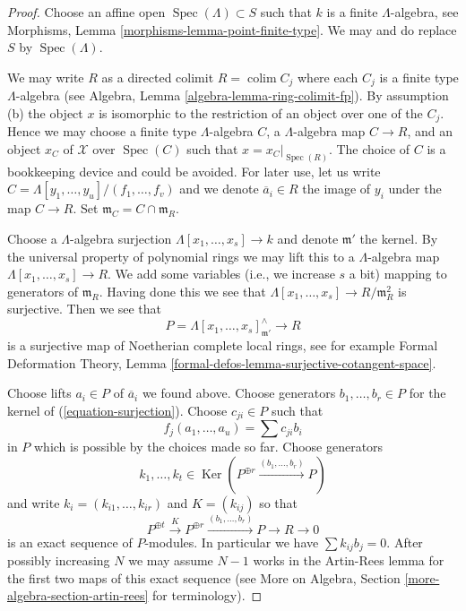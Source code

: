 \documentclass{stacks-project}
\theoremstyle{plain}
\theoremstyle{definition}
\theoremstyle{remark}
\numberwithin{equation}{subsection}
\def\colim{\mathop{\mathrm{colim}}\nolimits}
\def\Spec{\mathop{\mathrm{Spec}}}
\def\Ker{\mathop{\mathrm{Ker}}}
\begin{document}
\begin{proof}
Choose an affine open $\Spec(\Lambda) \subset S$ such that $k$ is a finite
$\Lambda$-algebra, see
Morphisms, Lemma \ref{morphisms-lemma-point-finite-type}.
We may and do replace $S$ by $\Spec(\Lambda)$.

\medskip\noindent
We may write $R$ as a directed colimit $R = \colim C_j$ where each
$C_j$ is a finite type $\Lambda$-algebra (see
Algebra, Lemma \ref{algebra-lemma-ring-colimit-fp}).
By assumption (b) the object $x$ is isomorphic to the restriction of
an object over one of the $C_j$. Hence we may choose a finite type
$\Lambda$-algebra $C$, a $\Lambda$-algebra map $C \to R$, and an object
$x_C$ of $\mathcal{X}$ over $\Spec(C)$ such that $x = x_C|_{\Spec(R)}$.
The choice of $C$ is a bookkeeping device and could be avoided.
For later use, let us write $C = \Lambda[y_1, \ldots, y_u]/(f_1, \ldots, f_v)$
and we denote $\overline{a}_i \in R$ the image of $y_i$ under the
map $C \to R$. Set $\mathfrak m_C = C \cap \mathfrak m_R$.

\medskip\noindent
Choose a $\Lambda$-algebra surjection $\Lambda[x_1, \ldots, x_s] \to k$
and denote $\mathfrak m'$ the kernel.
By the universal property of polynomial rings we may lift this
to a $\Lambda$-algebra map $\Lambda[x_1, \ldots, x_s] \to R$.
We add some variables (i.e., we increase $s$ a bit) mapping to generators
of $\mathfrak m_R$. Having done this we see that
$\Lambda[x_1, \ldots, x_s] \to R/\mathfrak m_R^2$ is surjective.
Then we see that
\begin{equation}
\label{equation-surjection}
P = \Lambda[x_1, \ldots, x_s]_{\mathfrak m'}^\wedge \longrightarrow R
\end{equation}
is a surjective map of Noetherian complete local rings, see for example
Formal Deformation Theory, Lemma
\ref{formal-defos-lemma-surjective-cotangent-space}.

\medskip\noindent
Choose lifts $a_i \in P$ of $\overline{a}_i$ we found above.
Choose generators $b_1, \ldots, b_r \in P$ for the kernel of
(\ref{equation-surjection}).
Choose $c_{ji} \in P$ such that
$$
f_j(a_1, \ldots, a_u) = \sum c_{ji} b_i
$$
in $P$ which is possible by the choices made so far. Choose generators
$$
k_1, \ldots, k_t \in
\Ker(P^{\oplus r} \xrightarrow{(b_1, \ldots, b_r)} P)
$$
and write $k_i = (k_{i1}, \ldots, k_{ir})$ and $K = (k_{ij})$
so that
$$
P^{\oplus t} \xrightarrow{K}
P^{\oplus r} \xrightarrow{(b_1, \ldots, b_r)}
P \to R \to 0
$$
is an exact sequence of $P$-modules. In particular we have
$\sum k_{ij} b_j = 0$. After possibly increasing $N$ we may
assume $N - 1$ works in the Artin-Rees lemma for the first two maps of this
exact sequence (see More on Algebra, Section
\ref{more-algebra-section-artin-rees} for terminology).


\end{proof}
\end{document}
